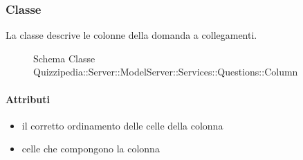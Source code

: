 \subsubsection{Classe }
La classe descrive le colonne della domanda a collegamenti.
\begin{figure}[H]
\centering
\noindent{}
\caption[Schema Classe Column]{Schema Classe Quizzipedia::Server::ModelServer::Services::Questions::Column}
\end{figure}
\paragraph{Attributi}
\begin{itemize}
\item {}
\newline
il corretto ordinamento delle celle della colonna
\item {}
\newline
celle che compongono la colonna
\end{itemize}
